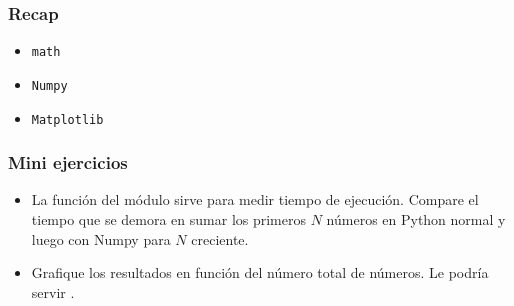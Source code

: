 \documentclass[14pt,aspectratio=169,xcolor=dvipsnames]{beamer}
\begin{document}
\begin{frame}\frametitle{Recap}
    \begin{itemize}
        \item \texttt{math}
        \item \texttt{Numpy}
        \item \texttt{Matplotlib}
    \end{itemize}
\end{frame}
\begin{frame}
    \maketitle
\end{frame}
\begin{frame}\frametitle{Mini ejercicios}
    \begin{itemize}
        \item La función  del módulo  sirve para medir tiempo de ejecución. Compare el tiempo que se demora en sumar los primeros $N$ números en Python normal y luego con Numpy para $N$ creciente.
        \item Grafique los resultados en función del número total de números. Le podría servir . 
    \end{itemize}
\end{frame}
\end{document}
